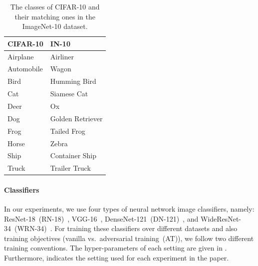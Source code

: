 \documentclass[conference]{IEEEtran}
\theoremstyle{definition}
\theoremstyle{remark}
\theoremstyle{proposition}
\begin{document}
\begin{table}[tb!]
	\caption{The classes of CIFAR-10 and their matching ones in the ImageNet-10 dataset.}
	\label{tab:imagenet10}
	\begin{center}
		\begin{small}
		    \setlength\tabcolsep{0.45em}
			\begin{tabular}{ll}
				\toprule
                \textbf{CIFAR-10}              & \textbf{IN-10}\\
                \midrule
				Airplane                       & Airliner\\
                Automobile                     & Wagon\\
                Bird                           & Humming Bird\\
                Cat                            & Siamese Cat\\
                Deer                           & Ox\\
                Dog                            & Golden Retriever\\
                Frog                           & Tailed Frog\\
                Horse                          & Zebra\\
                Ship                           & Container Ship\\
                Truck                          & Trailer Truck\\
			    \bottomrule
			\end{tabular}
		\end{small}
	\end{center}
\end{table}

\paragraph{Classifiers}
In our experiments, we use four types of neural network image classifiers, namely: ResNet-18~(RN-18)~\citep{he2016deep}, VGG-16~\citep{simonyan2015vgg}, DenseNet-121~(DN-121)~\citep{huang2017densenet}, and WideResNet-34~(WRN-34)~\citep{zagoruyko2016wresnet}.
For training these classifiers over different datasets and also training objectives (vanilla vs.~adversarial training~(AT)), we follow two different training conventions.
The hyper-parameters of each setting are given in .
Furthermore,  indicates the setting used for each experiment in the paper.
\end{document}

